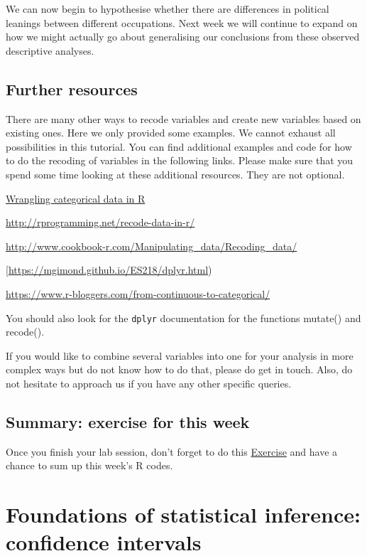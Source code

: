 \documentclass[
]{book}
\begin{document}
We can now begin to hypothesise whether there are differences in political leanings between different occupations. Next week we will continue to expand on how we might actually go about generalising our conclusions from these observed descriptive analyses.

\section{Further resources}\label{further-resources-1}

There are many other ways to recode variables and create new variables based on existing ones. Here we only provided some examples. We cannot exhaust all possibilities in this tutorial. You can find additional examples and code for how to do the recoding of variables in the following links. Please make sure that you spend some time looking at these additional resources. They are not optional.

\href{https://peerj.com/preprints/3163.pdf}{Wrangling categorical data in R}

\url{http://rprogramming.net/recode-data-in-r/}

\url{http://www.cookbook-r.com/Manipulating_data/Recoding_data/}

{[}\url{https://mgimond.github.io/ES218/dplyr.html})

\url{https://www.r-bloggers.com/from-continuous-to-categorical/}

You should also look for the \texttt{dplyr} documentation for the functions mutate() and recode().

If you would like to combine several variables into one for your analysis in more complex ways but do not know how to do that, please do get in touch. Also, do not hesitate to approach us if you have any other specific queries.

\section{Summary: exercise for this week}\label{summary-exercise-for-this-week-3}

Once you finish your lab session, don't forget to do this \href{https://eonk.shinyapps.io/MCD_ex}{Exercise} and have a chance to sum up this week's R codes.

\chapter{Foundations of statistical inference: confidence intervals}\label{foundations-of-statistical-inference-confidence-intervals}
\end{document}
